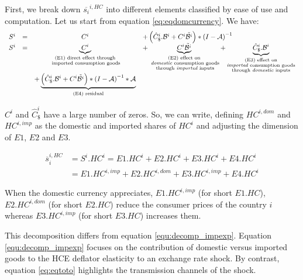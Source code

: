 \documentclass[12pt,a4paper]{paper}
\begin{document}
First, we break down $\overline{s_{i}}^{i,HC}$ into different elements classified by ease of use and computation.
Let us start from equation \ref{eq:eqdomcurrency}.
We have:
\begin{equation}
\begin{array}{lccl}
	S^ i&=&C^i	&+ \left(\hat{C}^i_\$.{\cal B}^i+{C^i}{\tilde{{\cal B}^i}}\right)*{{(I-{\cal A})}^{-1}} \\
	S^i &=&\underbrace{C^i}_{\substack{\text{(E1) direct effect through} \\ \text{ imported consumption goods}}}&+ \underbrace{{C^i}{\tilde{{\cal B}^i}}}_{\substack{\text{(E2) effect on} \\ \text{ \emph{domestic} consumption goods} \\ \text{ through \emph{imported} inputs}}}  + \underbrace{\hat{C}^i_\$.{\cal B}^i}_{\substack{\text{(E3)  effect on} \\ \text{\emph{imported} consumption goods} \\ \text{through \emph{domestic} inputs}}} \\ &&+\underbrace {\left( \hat{C}^i_\$.{\cal B}^i + {C^i}{\tilde{{\cal B}^i}}\right)*{{(I-{\cal A})}^{-1}}*{\cal A}}_{\text{(E4) residual}} \\
\end{array}
\label{eq:decomp}
\end{equation}


$C^i$ and $\hat{C}^i_\$$ have a large number of zeros. So, we can write, defining $HC^{i,dom}$ and $HC^{i,imp}$ as the domestic and imported shares of $HC^i$ and adjusting the dimension of $E1$, $E2$ and $E3$.

\begin{equation}
\begin{array}{lccl}
\overline{s}_{i}^{i,HC}&=S^i.HC^i=E1.HC^i+E2.HC^i+E3.HC^i+E4.HC^i \\
&=E1.HC^{i,imp}+E2.HC^{i,dom}+E3.HC^{i,imp}+E4.HC^i
 \end{array} 
 \label{eq:eqtoto}
 \end{equation}
 
When the domestic currency appreciates, $E1.HC^{i,imp}$ (for short $E1.HC$), $E2.HC^{i,dom}$ (for short $E2.HC$) reduce the consumer prices of the country $i$ whereas $E3.HC^{i,imp}$ (for short $E3.HC$) increases them. 

This decomposition differs from equation \ref{equ:decomp_impexp}. 
Equation \ref{equ:decomp_impexp} focuses on the contribution of domestic versus imported goods to the HCE deflator elasticity to an exchange rate shock.
By contrast, equation \ref{eq:eqtoto} highlights the transmission channels of the shock.
\end{document}
